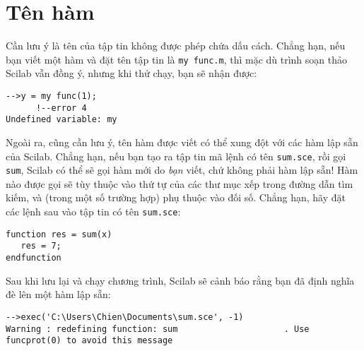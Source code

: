\documentclass[12pt]{book}
\begin{document}
\section{Tên hàm}

%
%
%
%
%

Cần lưu ý là tên của tập tin không được phép chứa dấu cách.
Chẳng hạn, nếu bạn viết một hàm và đặt tên tập tin là {\tt my func.m},
thì mặc dù trình soạn thảo Scilab vẫn đồng ý, nhưng khi thử chạy,
bạn sẽ nhận được:

\begin{verbatim}
-->y = my func(1);
      !--error 4 
Undefined variable: my
\end{verbatim}

Ngoài ra, cũng cần lưu ý, tên hàm được viết có thể xung đột với các hàm lập sẵn
của Scilab. Chẳng hạn, nếu bạn tạo ra tập tin mã lệnh có tên {\tt sum.sce}, 
rồi gọi {\tt sum}, Scilab có thể sẽ gọi hàm mới do {\em bạn} viết,
chứ không phải hàm lập sẵn! Hàm nào được gọi sẽ tùy thuộc vào thứ tự
của các thư mục xếp trong đường dẫn tìm kiếm, và (trong một số
trường hợp) phụ thuộc vào đối số. Chẳng hạn, hãy đặt các lệnh sau
vào tập tin có tên {\tt sum.sce}:

\begin{verbatim}
function res = sum(x)
   res = 7;
endfunction
\end{verbatim}

Sau khi lưu lại và chạy chương trình, Scilab sẽ cảnh báo rằng bạn 
đã định nghĩa đè lên một hàm lập sẵn:
\begin{verbatim}
-->exec('C:\Users\Chien\Documents\sum.sce', -1)
Warning : redefining function: sum                     . Use funcprot(0) to avoid this message
\end{verbatim}
\end{document}
